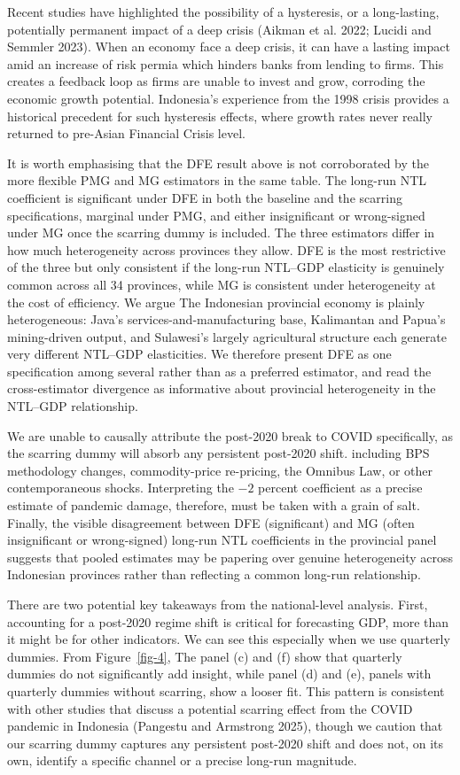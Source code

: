 \documentclass[
  manuscript=article,
  layout=publish,
  year=2026,
  volume=3,
]{den}
\begin{document}
Recent studies have highlighted the possibility of a hysteresis, or a
long-lasting, potentially permanent impact of a deep crisis (Aikman et
al. 2022; Lucidi and Semmler 2023). When an economy face a deep crisis,
it can have a lasting impact amid an increase of risk permia which
hinders banks from lending to firms. This creates a feedback loop as
firms are unable to invest and grow, corroding the economic growth
potential. Indonesia's experience from the 1998 crisis provides a
historical precedent for such hysteresis effects, where growth rates
never really returned to pre-Asian Financial Crisis level.

It is worth emphasising that the DFE result above is not corroborated by
the more flexible PMG and MG estimators in the same table. The long-run
NTL coefficient is significant under DFE in both the baseline and the
scarring specifications, marginal under PMG, and either insignificant or
wrong-signed under MG once the scarring dummy is included. The three
estimators differ in how much heterogeneity across provinces they allow.
DFE is the most restrictive of the three but only consistent if the
long-run NTL--GDP elasticity is genuinely common across all 34
provinces, while MG is consistent under heterogeneity at the cost of
efficiency. We argue The Indonesian provincial economy is plainly
heterogeneous: Java's services-and-manufacturing base, Kalimantan and
Papua's mining-driven output, and Sulawesi's largely agricultural
structure each generate very different NTL--GDP elasticities. We
therefore present DFE as one specification among several rather than as
a preferred estimator, and read the cross-estimator divergence as
informative about provincial heterogeneity in the NTL--GDP relationship.

We are unable to causally attribute the post-2020 break to COVID
specifically, as the scarring dummy will absorb any persistent post-2020
shift. including BPS methodology changes, commodity-price re-pricing,
the Omnibus Law, or other contemporaneous shocks. Interpreting the
\(-2\) percent coefficient as a precise estimate of pandemic damage,
therefore, must be taken with a grain of salt. Finally, the visible
disagreement between DFE (significant) and MG (often insignificant or
wrong-signed) long-run NTL coefficients in the provincial panel suggests
that pooled estimates may be papering over genuine heterogeneity across
Indonesian provinces rather than reflecting a common long-run
relationship.

There are two potential key takeaways from the national-level analysis.
First, accounting for a post-2020 regime shift is critical for
forecasting GDP, more than it might be for other indicators. We can see
this especially when we use quarterly dummies. From Figure~\ref{fig-4},
The panel (c) and (f) show that quarterly dummies do not significantly
add insight, while panel (d) and (e), panels with quarterly dummies
without scarring, show a looser fit. This pattern is consistent with
other studies that discuss a potential scarring effect from the COVID
pandemic in Indonesia (Pangestu and Armstrong 2025), though we caution
that our scarring dummy captures any persistent post-2020 shift and does
not, on its own, identify a specific channel or a precise long-run
magnitude.
\end{document}
